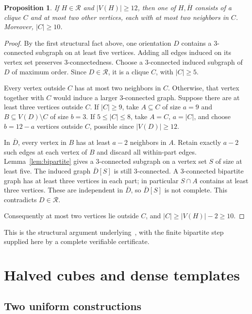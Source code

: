 \documentclass[11pt,reqno]{amsart}
\newtheorem{proposition}[theorem]{Proposition}
\theoremstyle{definition}
\theoremstyle{remark}
\newcommand{\comp}[1]{\overline{#1}}
\newcommand{\Rclass}{\mathcal{R}}
\begin{document}
\begin{proposition}\label{prop:dense-reduction}
If $H\in\Rclass$ and $|V(H)|\ge12$, then one of $H,\comp H$ consists of a clique $C$ and at most two other vertices, each with at most two neighbors in $C$. Moreover, $|C|\ge10$.
\end{proposition}
\begin{proof}
By the first structural fact above, one orientation $D$ contains a $3$-connected subgraph on at least five vertices. Adding all edges induced on its vertex set preserves $3$-connectedness. Choose a $3$-connected induced subgraph of $D$ of maximum order. Since $D\in\Rclass$, it is a clique $C$, with $|C|\ge5$.

Every vertex outside $C$ has at most two neighbors in $C$. Otherwise, that vertex together with $C$ would induce a larger $3$-connected graph. Suppose there are at least three vertices outside $C$. If $|C|\ge9$, take $A\subseteq C$ of size $a=9$ and $B\subseteq V(D)\setminus C$ of size $b=3$. If $5\le|C|\le8$, take $A=C$, $a=|C|$, and choose $b=12-a$ vertices outside $C$, possible since $|V(D)|\ge12$.

In $\comp D$, every vertex in $B$ has at least $a-2$ neighbors in $A$. Retain exactly $a-2$ such edges at each vertex of $B$ and discard all within-part edges. Lemma~\ref{lem:bipartite} gives a $3$-connected subgraph on a vertex set $S$ of size at least five. The induced graph $\comp D[S]$ is still $3$-connected. A $3$-connected bipartite graph has at least three vertices in each part; in particular $S\cap A$ contains at least three vertices. These are independent in $\comp D$, so $\comp D[S]$ is not complete. This contradicts $D\in\Rclass$.

Consequently at most two vertices lie outside $C$, and $|C|\ge|V(H)|-2\ge10$.
\end{proof}

This is the structural argument underlying~\cite[proof of Theorem~10]{BGJMS}, with the finite bipartite step supplied here by a complete verifiable certificate.

\section{Halved cubes and dense templates}\label{sec:dense}

\subsection{Two uniform constructions}
\end{document}
